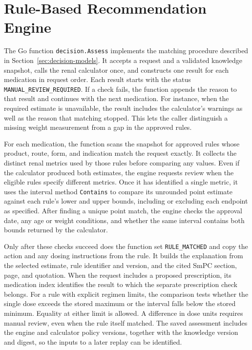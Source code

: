 \documentclass[12pt,a4paper,twoside]{book}
\begin{document}
\section{Rule-Based Recommendation Engine}
\label{sec:recommendation-engine}

The Go function \texttt{decision.Assess} implements the matching procedure described in Section~\ref{sec:decision-models}.
It accepts a request and a validated knowledge snapshot, calls the renal calculator once, and constructs one result for each medication in request order.
Each result starts with the status \texttt{MANUAL\_REVIEW\_REQUIRED}.
If a check fails, the function appends the reason to that result and continues with the next medication.
For instance, when the required estimate is unavailable, the result includes the calculator's warnings as well as the reason that matching stopped.
This lets the caller distinguish a missing weight measurement from a gap in the approved rules.

For each medication, the function scans the snapshot for approved rules whose product, route, form, and indication match the request exactly.
It collects the distinct renal metrics used by those rules before comparing any values.
Even if the calculator produced both estimates, the engine requests review when the eligible rules specify different metrics.
Once it has identified a single metric, it uses the interval method \texttt{Contains} to compare its unrounded point estimate against each rule's lower and upper bounds, including or excluding each endpoint as specified.
After finding a unique point match, the engine checks the approval date, any age or weight conditions, and whether the same interval contains both bounds returned by the calculator.

Only after these checks succeed does the function set \texttt{RULE\_MATCHED} and copy the action and any dosing instructions from the rule.
It builds the explanation from the selected estimate, rule identifier and version, and the cited SmPC section, page, and quotation.
When the request includes a proposed prescription, its medication index identifies the result to which the separate prescription check belongs.
For a rule with explicit regimen limits, the comparison tests whether the single dose exceeds the stored maximum or the interval falls below the stored minimum.
Equality at either limit is allowed. A difference in dose units requires manual review, even when the rule itself matched.
The saved assessment includes the engine and calculator policy versions, together with the knowledge version and digest, so the inputs to a later replay can be identified.
\end{document}
